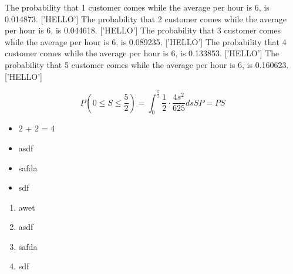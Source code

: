 \documentclass[12pt]{article}
\begin{document}
    
    The probability that 1 customer comes while the average per hour is 6, is 0.014873.
    ['HELLO']
    The probability that 2 customer comes while the average per hour is 6, is 0.044618.
    ['HELLO']
    The probability that 3 customer comes while the average per hour is 6, is 0.089235.
    ['HELLO']
    The probability that 4 customer comes while the average per hour is 6, is 0.133853.
    ['HELLO']
    The probability that 5 customer comes while the average per hour is 6, is 0.160623.
    ['HELLO']

    
    \[
        P(0 \leq S \leq \frac{5}{2}) = \int_{0}^{\frac{5}{2}} \frac{1}{2} \cdot \frac{{4s^2}}{625} ds
        
        SP = PS
    \]
    \begin{itemize}
        \item 2 + 2 = 4
        \item asdf
        \item safda
        \item sdf
    \end{itemize}
    
    \begin{enumerate}
        \item awet
        \item asdf
        \item safda
        \item sdf
    \end{enumerate}
\end{document}
